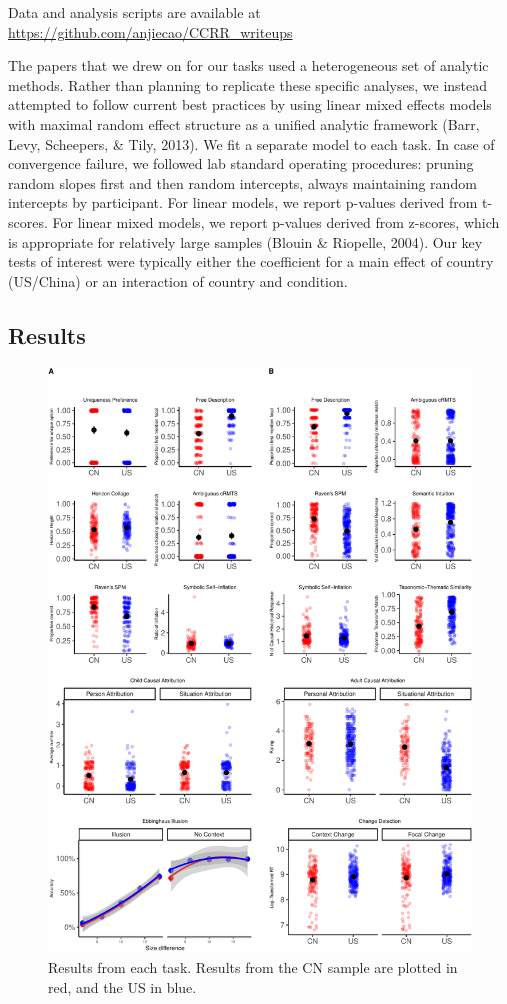 \documentclass[
  man,floatsintext]{apa6}
\begin{document}
Data and analysis scripts are available at \url{https://github.com/anjiecao/CCRR_writeups}

The papers that we drew on for our tasks used a heterogeneous set of analytic methods. Rather than planning to replicate these specific analyses, we instead attempted to follow current best practices by using linear mixed effects models with maximal random effect structure as a unified analytic framework (Barr, Levy, Scheepers, \& Tily, 2013). We fit a separate model to each task. In case of convergence failure, we followed lab standard operating procedures: pruning random slopes first and then random intercepts, always maintaining random intercepts by participant. For linear models, we report p-values derived from t-scores. For linear mixed models, we report p-values derived from z-scores, which is appropriate for relatively large samples (Blouin \& Riopelle, 2004). Our key tests of interest were typically either the coefficient for a main effect of country (US/China) or an interaction of country and condition.

\hypertarget{results}{%
\subsection{Results}\label{results}}

\begin{figure}
\centering
\includegraphics{CCRR_manuscript_files/figure-latex/unnamed-chunk-14-1.pdf}
\caption{\label{fig:unnamed-chunk-14}Results from each task. Results from the CN sample are plotted in red, and the US in blue.}
\end{figure}
\end{document}
